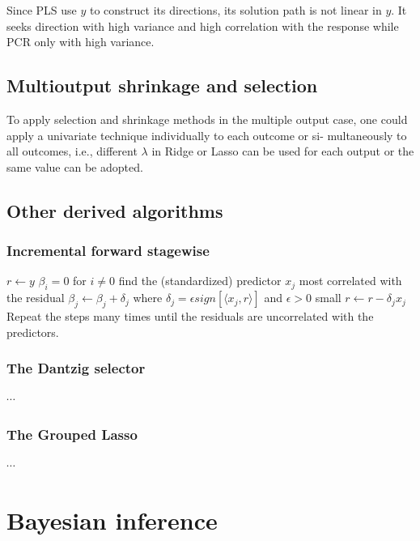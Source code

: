 \documentclass[12pt, letterpaper]{article}
\theoremstyle{definition}
\begin{document}
Since PLS use $y$ to construct its directions, its solution path is not linear in $y$. It seeks direction with high variance and high correlation with the response while PCR only with high variance.

\subsection{Multioutput shrinkage and selection}
To apply selection and shrinkage methods in the multiple output case, one could apply a univariate technique individually to each outcome or si- multaneously to all outcomes, i.e., different $\lambda$ in Ridge or Lasso can be used for each output or the same value can be adopted.

\subsection{Other derived algorithms}
\subsubsection{Incremental forward stagewise}
\begin{algorithm}
$r\leftarrow y$ \;
$\beta_i =0$ for $i\ne 0$\;
find the (standardized) predictor $x_j$ most correlated with the residual \;
$\beta_j \leftarrow \beta_j + \delta_j$ where $\delta_j = \epsilon sign\left[\langle x_j, r \rangle\right]$ and $\epsilon >0$ small\;
$r\leftarrow r-\delta_j x_j$\;
Repeat the steps many times until the residuals are uncorrelated with the predictors.
\end{algorithm}

\subsubsection{The Dantzig selector}
$\cdots$

\subsubsection{The Grouped Lasso}
$\cdots$
\newpage
\section{Bayesian inference}
\end{document}
